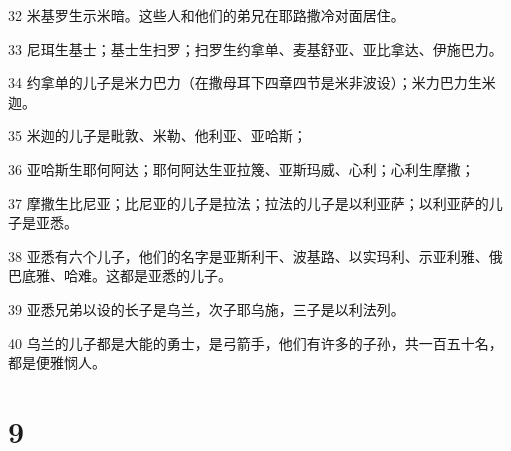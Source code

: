 \par 32 米基罗生示米暗。这些人和他们的弟兄在耶路撒冷对面居住。
\par 33 尼珥生基士；基士生扫罗；扫罗生约拿单、麦基舒亚、亚比拿达、伊施巴力。
\par 34 约拿单的儿子是米力巴力（在撒母耳下四章四节是米非波设）；米力巴力生米迦。
\par 35 米迦的儿子是毗敦、米勒、他利亚、亚哈斯；
\par 36 亚哈斯生耶何阿达；耶何阿达生亚拉篾、亚斯玛威、心利；心利生摩撒；
\par 37 摩撒生比尼亚；比尼亚的儿子是拉法；拉法的儿子是以利亚萨；以利亚萨的儿子是亚悉。
\par 38 亚悉有六个儿子，他们的名字是亚斯利干、波基路、以实玛利、示亚利雅、俄巴底雅、哈难。这都是亚悉的儿子。
\par 39 亚悉兄弟以设的长子是乌兰，次子耶乌施，三子是以利法列。
\par 40 乌兰的儿子都是大能的勇士，是弓箭手，他们有许多的子孙，共一百五十名，都是便雅悯人。

\chapter{9}

